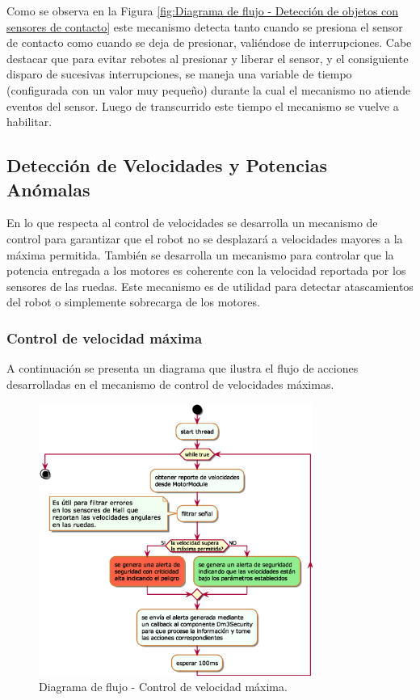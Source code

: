 \documentclass[withindex,glossary]{cam-thesis}
\begin{document}
Como se observa en la Figura \ref{fig:Diagrama de flujo - Detección de objetos con sensores de contacto} este mecanismo detecta tanto cuando se presiona el sensor de contacto como cuando se deja de presionar, valiéndose de interrupciones. Cabe destacar que para evitar rebotes al presionar y liberar el sensor, y el consiguiente disparo de sucesivas interrupciones, se maneja una variable de tiempo (configurada con un valor muy pequeño) durante la cual el mecanismo no atiende eventos del sensor. Luego de transcurrido este tiempo el mecanismo se vuelve a habilitar.

\subsection{Detección de Velocidades y Potencias Anómalas}
En lo que respecta al control de velocidades se desarrolla un mecanismo de control para garantizar que el robot no se desplazará a velocidades mayores a la máxima permitida.
También se desarrolla un mecanismo para controlar que la potencia entregada a los motores es coherente con la velocidad reportada por los sensores de las ruedas. Este mecanismo es de utilidad para detectar atascamientos del robot o simplemente sobrecarga de los motores.

\subsubsection{Control de velocidad máxima} \label{sec: Control de velocidad máxima}
A continuación se presenta un diagrama que ilustra el flujo de acciones desarrolladas en el mecanismo de control de velocidades máximas.

\begin{figure}[H]
\centering
\includegraphics[width=0.8\textwidth]{images/Diagrama_de_flujo_Dm3Security_Speeds}
\caption[Diagrama de flujo - Control de velocidad máxima]{Diagrama de flujo - Control de velocidad máxima.}
\label{fig: Diagrama de flujo - Control de velocidad máxima}
\end{figure}
\end{document}
